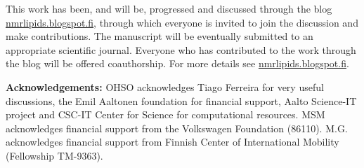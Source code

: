 \documentclass[pre,aps,floatfix,authordate1-4,twocolumn]{revtex4-1}
\begin{document}












This work has been, and will be, progressed and discussed through the blog \url{nmrlipids.blogspot.fi}, through which 
everyone is invited to join the discussion and make contributions. 
The manuscript will be eventually submitted to an appropriate scientific journal. 
Everyone who has contributed to the work through the blog will be offered 
coauthorship. For more details see \url{nmrlipids.blogspot.fi}.   

{\bf Acknowledgements: }
OHSO acknowledges Tiago Ferreira for very useful discussions, the Emil Aaltonen foundation for financial support, Aalto Science-IT project and CSC-IT Center for Science for computational resources. 
%
MSM acknowledges financial support from the Volkswagen Foundation (86110).
%
M.G. acknowledges financial support from Finnish Center of International Mobility (Fellowship TM-9363).
\end{document}
